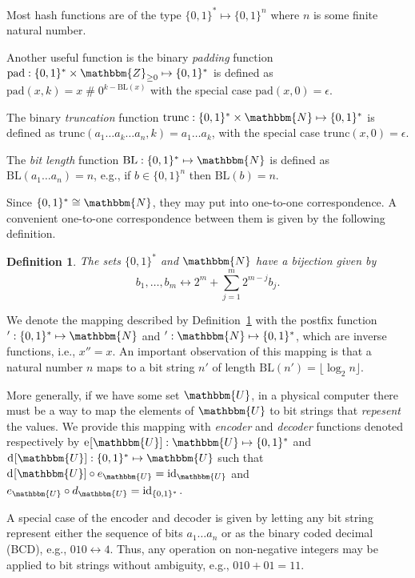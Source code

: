 \documentclass[hidelinks,11pt,final]{article}
\newcommand{\envnumstyle}{section}
\theoremstyle{plain}
\newtheorem{definition}{Definition}[\envnumstyle]
\newcommand{\cat}{\mathbin{\#}}
\newcommand{\BL}{\mathrm{BL}}
\newcommand{\Fun}[2][]{\mathrm{#2}_{#1}}
\begin{document}
Most hash functions are of the type $\{0,1\}^* \mapsto \{0,1\}^n$ where $n$ is some finite natural number.

Another useful function is the binary \emph{padding} function
$\mathrm{pad} : \{0,1\}^* \times \mathbbm{Z}_{\geq 0} \mapsto \{0,1\}^*$ is defined as $\mathrm{pad}(x,k) = x \cat 0^{k-\mathrm{BL}(x)}$ with the special case $\mathrm{pad}(x,0) = \epsilon$.


The binary \emph{truncation} function $\mathrm{trunc} : \{0,1\}^* \times \mathbbm{N} \mapsto \{0,1\}^*$ is defined as $\mathrm{trunc}(a_1 \ldots a_k \ldots a_n, k) = a_1 \ldots a_k$, with the special case $\mathrm{trunc}(x,0) = \epsilon$.

The \emph{bit length} function $\mathrm{BL} : \{0,1\}^* \mapsto \mathbbm{N}$ is defined as $\BL(a_1 \ldots a_n) = n$, e.g., if $b \in \{0,1\}^{n}$ then $\mathrm{BL}(b) = n$.

Since $\{0,1\}^* \cong \mathbbm{N}$, they may put into one-to-one correspondence.
A convenient one-to-one correspondence between them is given by the following definition.
\begin{definition}
	\label{def:mapping}
	The sets $\{0,1\}^*$ and $\mathbbm{N}$ have a bijection given by
	\begin{equation}
	b_1,\ldots,b_m \longleftrightarrow 2^m + \sum_{j=1}^{m} 2^{m - j} b_j.
	\end{equation}
\end{definition}

We denote the mapping described by Definition~\ref{def:mapping} with the postfix function $' : \{0,1\}^* \mapsto \mathbbm{N}$ and $' : \mathbbm{N} \mapsto \{0,1\}^*$, which are inverse functions, i.e., $x'' = x$.
An important observation of this mapping is that a natural number $n$ maps to a bit string $n'$ of length $\BL(n') = \lfloor \log_2 n \rfloor$.

More generally, if we have some set $\mathbbm{U}$, in a physical computer there must be a way to map the elements of $\mathbbm{U}$ to bit strings that \emph{repesent} the values.
We provide this mapping with \emph{encoder} and \emph{decoder} functions denoted respectively by $\Fun{e}[\mathbbm{U}] : \mathbbm{U} \mapsto \{0,1\}^*$ and $\Fun{d}[\mathbbm{U}] : \{0,1\}^* \mapsto \mathbbm{U}$ such that $\Fun{d}[\mathbbm{U}] \circ e_\mathbbm{U} = \mathrm{id}_\mathbbm{U}$ and $e_\mathbbm{U} \circ d_\mathbbm{U} = \mathrm{id}_{\{0,1\}^*}$.

A special case of the encoder and decoder is given by letting any bit string represent either the sequence of bits $a_1 \ldots a_n$ or as the binary coded decimal (BCD), e.g., $010 \longleftrightarrow 4$.
Thus, any operation on non-negative integers may be applied to bit strings without ambiguity, e.g., $010 + 01 = 11$.
\end{document}
